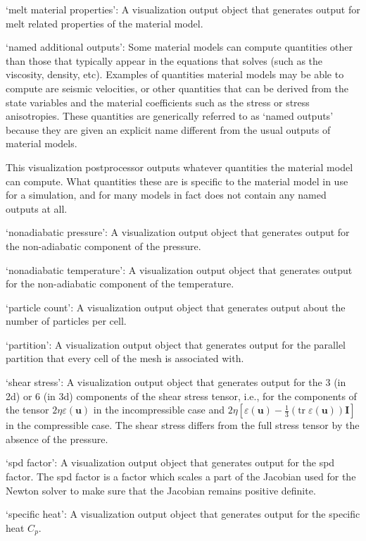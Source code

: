 \begin{itemize}
`melt material properties': A visualization output object that generates output for melt related properties of the material model.

`named additional outputs': Some material models can compute quantities other than those that typically appear in the equations that \aspect{} solves (such as the viscosity, density, etc). Examples of quantities material models may be able to compute are seismic velocities, or other quantities that can be derived from the state variables and the material coefficients such as the stress or stress anisotropies. These quantities are generically referred to as `named outputs' because they are given an explicit name different from the usual outputs of material models.

This visualization postprocessor outputs whatever quantities the material model can compute. What quantities these are is specific to the material model in use for a simulation, and for many models in fact does not contain any named outputs at all.

`nonadiabatic pressure': A visualization output object that generates output for the non-adiabatic component of the pressure.

`nonadiabatic temperature': A visualization output object that generates output for the non-adiabatic component of the temperature.

`particle count': A visualization output object that generates output about the number of particles per cell.

`partition': A visualization output object that generates output for the parallel partition that every cell of the mesh is associated with.

`shear stress': A visualization output object that generates output for the 3 (in 2d) or 6 (in 3d) components of the shear stress tensor, i.e., for the components of the tensor $2\eta\varepsilon(\mathbf u)$ in the incompressible case and $2\eta\left[\varepsilon(\mathbf u)-\tfrac 13(\textrm{tr}\;\varepsilon(\mathbf u))\mathbf I\right]$ in the compressible case. The shear stress differs from the full stress tensor by the absence of the pressure.

`spd factor': A visualization output object that generates output for the spd factor. The spd factor is a factor which scales a part of the Jacobian used for the Newton solver to make sure that the Jacobian remains positive definite.

`specific heat': A visualization output object that generates output for the specific heat $C_p$.


\end{itemize}
